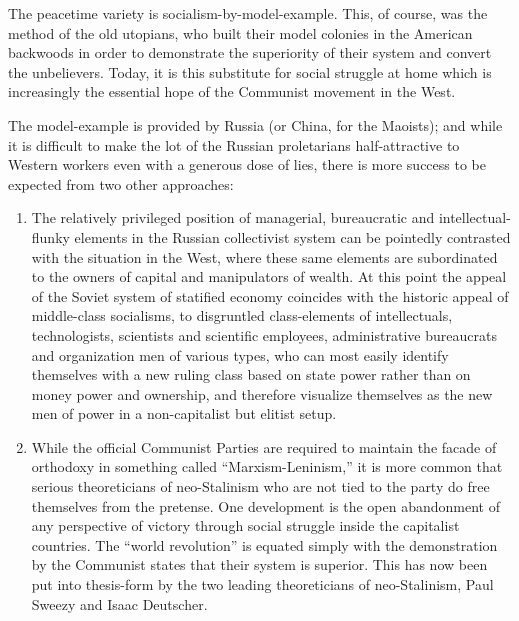 The peacetime variety is socialism-by-model-example. This, of course, was the method of the old utopians, who built their model colonies in the American backwoods in order to demonstrate the superiority of their system and convert the unbelievers. Today, it is this substitute for social struggle at home which is increasingly the essential hope of the Communist movement in the West.

The model-example is provided by Russia (or China, for the Maoists); and while it is difficult to make the lot of the Russian proletarians half-attractive to Western workers even with a generous dose of lies, there is more success to be expected from two other approaches:

\begin{enumerate}
\item The relatively privileged position of managerial, bureaucratic and intellectual-flunky elements in the Russian collectivist system can be pointedly contrasted with the situation in the West, where these same elements are subordinated to the owners of capital and manipulators of wealth. At this point the appeal of the Soviet system of statified economy coincides with the historic appeal of middle-class socialisms, to disgruntled class-elements of intellectuals, technologists, scientists and scientific employees, administrative bureaucrats and organization men of various types, who can most easily identify themselves with a new ruling class based on state power rather than on money power and ownership, and therefore visualize themselves as the new men of power in a non-capitalist but elitist setup.

\item While the official Communist Parties are required to maintain the facade of orthodoxy in something called ``Marxism-Leninism,'' it is more common that serious theoreticians of neo-Stalinism who are not tied to the party do free themselves from the pretense. One development is the open abandonment of any perspective of victory through social struggle inside the capitalist countries. The ``world revolution'' is equated simply with the demonstration by the Communist states that their system is superior. This has now been put into thesis-form by the two leading theoreticians of neo-Stalinism, Paul Sweezy and Isaac Deutscher.
\end{enumerate}

